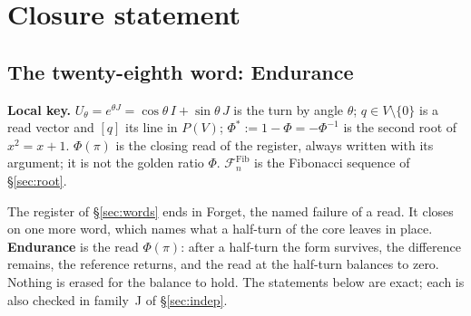 \documentclass[11pt,a4paper]{article}
\newcommand{\lkey}[1]{\par\noindent\textbf{Local key.} #1\par\smallskip}
\theoremstyle{plain}
\theoremstyle{definition}
\theoremstyle{remark}
\begin{document}
\section{Closure statement}\label{sec:close}

\subsection{The twenty-eighth word: Endurance}\label{sec:endurance}
\lkey{$U_\theta=e^{\theta J}=\cos\theta\,I+\sin\theta\,J$ is the turn by angle $\theta$; $q\in V\setminus\{0\}$ is a read vector and $[q]$ its line in $P(V)$; $\Phi^{\ast}:=1-\Phi=-\Phi^{-1}$ is the second root of $x^2=x+1$. $\Phi(\pi)$ is the closing read of the register, always written with its argument; it is not the golden ratio $\Phi$. $\mathcal F^{\mathrm{Fib}}_n$ is the Fibonacci sequence of \S\ref{sec:root}.}
The register of \S\ref{sec:words} ends in Forget, the named failure of a read. It closes on one more word, which names what a half-turn of the core leaves in place. \textbf{Endurance} is the read $\Phi(\pi)$: after a half-turn the form survives, the difference remains, the reference returns, and the read at the half-turn balances to zero. Nothing is erased for the balance to hold. The statements below are exact; each is also checked in family~J of \S\ref{sec:indep}.
\end{document}
